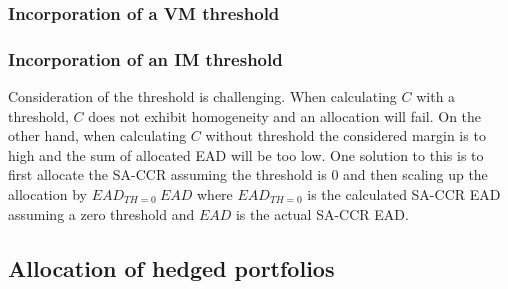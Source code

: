 \documentclass[../Thesis_AHoecherl.tex]{subfiles}
\begin{document}
    \subsubsection{Incorporation of a VM threshold\label{sec:Incorporation of a VM threshold}}

    \subsubsection{Incorporation of an IM threshold\label{sec:Incorporation of an IM threshold}}

    Consideration of the threshold is challenging. When calculating $C$ with a threshold, $C$ does not exhibit homogeneity and an allocation will fail. On the other hand, when calculating $C$ without threshold the considered margin is to high and the sum of allocated EAD will be too low.
    One solution to this is to first allocate the SA-CCR assuming the threshold is 0 and then scaling up the allocation by $EAD_{TH = 0} \ EAD$ where $EAD_{TH = 0}$ is the calculated SA-CCR EAD assuming a zero threshold and $EAD$ is the actual SA-CCR EAD.


    \subsection{Allocation of hedged portfolios}
\end{document}
